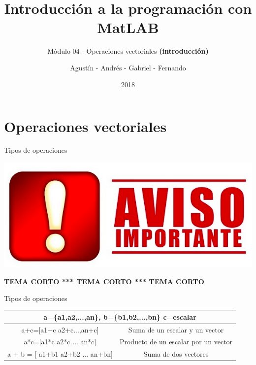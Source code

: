 \documentclass{bredelebeamer}
\title[Programación en MatLAB]{Introducción a la programación con MatLAB}
\subtitle{Módulo 04 - Operaciones vectoriales \textbf{(introducción)}}
\author{Agustín - Andrés - Gabriel - Fernando\inst{1}}
\institute[UTN.BA]
{
  \inst{1}%
  Universidad Tecnológica Nacional\\
  Facultad Regional Buenos Aires
  }
\date{2018}
\begin{document}
\begin{frame}
  \titlepage 
\end{frame}




\section{Operaciones vectoriales}

\begin{frame}{Tipos de operaciones}
\begin{center}
\includegraphics[scale=0.3]{images/img40.png}
\end{center}
\begin{center}
\textbf{TEMA CORTO *** TEMA CORTO *** TEMA CORTO}
\end{center}
\end{frame}

\begin{frame}{Tipos de operaciones}
\begin{table}[]
\centering
\begin{tabular}{|c|c|}
\hline
\multicolumn{2}{|c|}{a=\{a1,a2,...,an\}, b=\{b1,b2,...,bn\} c=escalar}                                                                           \\ \hline
a+c={[}a1+c a2+c...,an+c{]}                                                                            & Suma de un escalar y un vector          \\ \hline
a*c={[}a1*c a2*c ... an*c{]}                                                                           & Producto de un escalar por un vector    \\ \hline
a + b = {[} a1+b1 a2+b2 ... an+bn{]}                                                                   & Suma de dos vectores                    \\ \hline
\end{tabular}
\end{table}
\end{frame}
\end{document}
